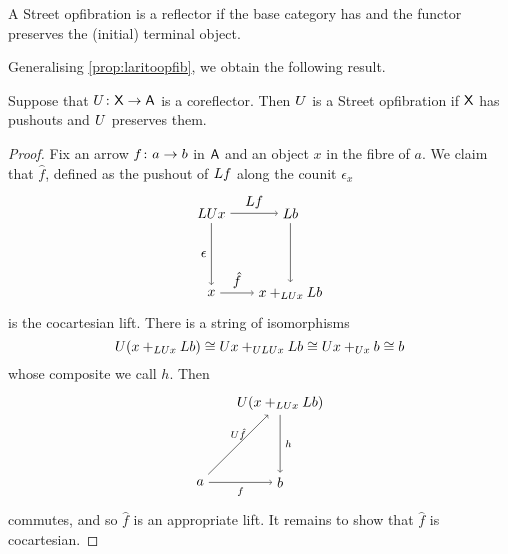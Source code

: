 \documentclass{amsart}
\begin{document}
\begin{cor}
  A Street opfibration is a reflector if the base
  category has and the functor preserves the (initial)
  terminal object.
\end{cor}

Generalising \cref{prop:laritoopfib}, we obtain the following result.

\begin{prop}
  \label{thm:corefl-to-street-opfib}
  Suppose that $ U \colon \mathsf{X} \to \mathsf{A} $ is a
  coreflector. Then $ U $ is a Street opfibration
  if $ \mathsf{X} $ has pushouts and $ U $ preserves them.
\end{prop}

\begin{proof}
  Fix an arrow $ f \colon a \to b $ in $ \mathsf{A} $
  and an object $ x $ in the fibre of $ a $. We
  claim that $ \hat{f} $, defined as the pushout
  of $ L f $
  along the counit $ \epsilon_x $
  \[
    \begin{tikzpicture}
      \node (ul) at (0,2) {$ \L \U x $};
      \node (ll) at (0,0) {$ x $};
      \node (ur) at (2,2) {$ \L b $};
      \node (lr) at (2,0) {$ x +_{\L\U x} \L b$};
      \draw [->] (ul) to node [left] {$ \epsilon $} (ll);
      \draw [->] (ul) to node [above] {$ \L f $} (ur);
      \draw [->] (ll) to node [above] {$ \hat{f} $} (lr);
      \draw [->] (ur) to (lr);
    \end{tikzpicture}
  \]
  is the cocartesian lift. There is a string of
  isomorphisms
  \[
    U ( x +_{LU x} L b ) \cong
    U x +_{ULU x} L b \cong
    U x +_{U x} b \cong
    b
  \]
  whose composite we call $ h $.  Then
  \[
    \begin{tikzpicture}
      \node (a) at (0,0) {$ a $};
      \node (b) at (2,0) {$ b $};
      \node (c) at (2,2) {$ \U ( x+_{\L\U x} \L b ) $};
      \path[->,font=\scriptsize]
      (a) edge node[below]{$ f $} (b)
      (a) edge node[above]{$ \U\hat{f} $} (c)
      (c) edge node[right]{$ h $} (b);
    \end{tikzpicture}
  \]
  commutes, and so $ \hat{f} $ is an appropriate
  lift. It remains to show that $ \hat{f} $ is
  cocartesian.


\end{proof}
\end{document}
